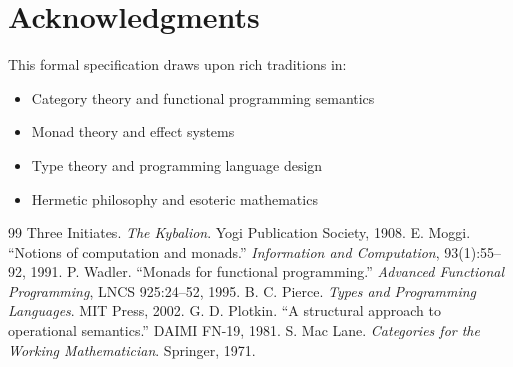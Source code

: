 \documentclass[11pt,twoside,openright]{book}
\theoremstyle{definition}
\theoremstyle{plain}
\theoremstyle{remark}
\begin{document}

\backmatter

\chapter*{Acknowledgments}

This formal specification draws upon rich traditions in:
\begin{itemize}
\item Category theory and functional programming semantics
\item Monad theory and effect systems
\item Type theory and programming language design
\item Hermetic philosophy and esoteric mathematics
\end{itemize}

\begin{thebibliography}{99}
 Three Initiates. \textit{The Kybalion}. Yogi Publication Society, 1908.
 E. Moggi. ``Notions of computation and monads.'' \textit{Information and Computation}, 93(1):55--92, 1991.
 P. Wadler. ``Monads for functional programming.'' \textit{Advanced Functional Programming}, LNCS 925:24--52, 1995.
 B. C. Pierce. \textit{Types and Programming Languages}. MIT Press, 2002.
 G. D. Plotkin. ``A structural approach to operational semantics.'' DAIMI FN-19, 1981.
 S. Mac Lane. \textit{Categories for the Working Mathematician}. Springer, 1971.
\end{thebibliography}

\printindex
\end{document}
